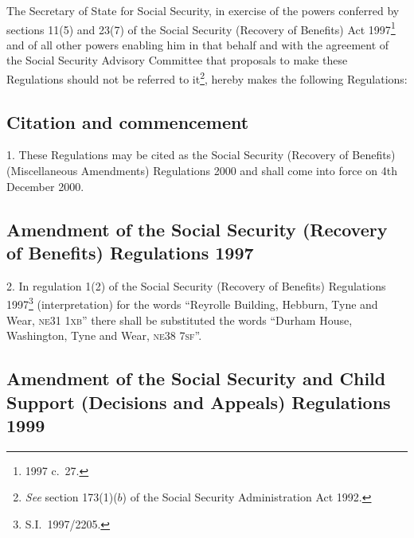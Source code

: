 \documentclass[12pt,a4paper]{article}
\title{\regstitle}
\author{S.I.\ 2000 No.\ 3030}
\date{Made
8th November 2000\\
Laid before Parliament
13th November 2000\\
Coming into force
4th December 2000
}
\begin{document}
\maketitle

\noindent
The Secretary of State for Social Security, in exercise of the powers conferred by sections 11(5) and 23(7) of the Social Security (Recovery of Benefits) Act 1997\footnote{1997 c.\ 27.} and of all other powers enabling him in that behalf and with the agreement of the Social Security Advisory Committee that proposals to make these Regulations should not be referred to it\footnote{\emph{See} section 173(1)($b$)  of the Social Security Administration Act 1992.}, hereby makes the following Regulations: 

{\sloppy

\tableofcontents

}

\bigskip

\setcounter{secnumdepth}{-2}

\subsection[1. Citation and commencement]{Citation and commencement}

1.  These Regulations may be cited as the Social Security (Recovery of Benefits) (Miscellaneous Amendments) Regulations 2000 and shall come into force on 4th December 2000.

\subsection[2. Amendment of the Social Security (Recovery of Benefits) Regulations 1997]{Amendment of the Social Security (Recovery of Benefits) Regulations 1997}

2.  In regulation 1(2) of the Social Security (Recovery of Benefits) Regulations 1997\footnote{S.I.\ 1997/2205.} (interpretation) for the words “Reyrolle Building, Hebburn, Tyne and Wear, \textsc{\lowercase{NE31 1XB}}” there shall be substituted the words “Durham House, Washington, Tyne and Wear, \textsc{\lowercase{NE38 7SF}}”.

\subsection[3, 4. Amendment of the Social Security and Child Support (Decisions and Appeals) Regulations 1999]{Amendment of the Social Security and Child Support (Decisions and Appeals) Regulations 1999}
\end{document}
